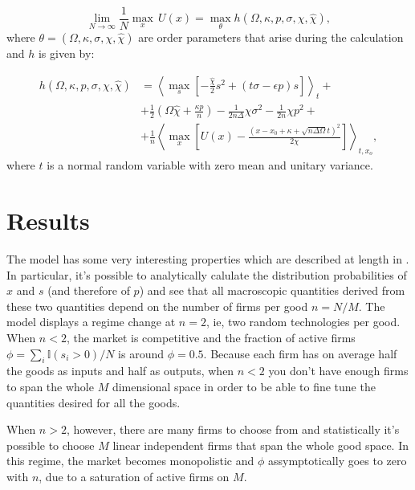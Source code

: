 \begin{equation}
  \label{eq:52}
  \lim_{N\to \infty} \frac{1}{N} \max_x \, U(x) = \max_\theta h(\Omega, \kappa,
  p, \sigma, \chi, \hat{\chi}),
\end{equation}
where $\theta = (\Omega, \kappa,
  \sigma, \chi, \hat{\chi})$ are order parameters that arise during
  the calculation and $h$ is given by:

\begin{align}
  \label{eq:53}
  h(\Omega, \kappa, p, \sigma, \chi, \hat{\chi})& = \left\langle
    \max_s \left[-\frac{\hat{\chi}}{2}s^2 + (t \sigma - \epsilon p)
                                                  s\right]
                                                  \right\rangle_t +
                                                  \nonumber\\ & +
  \frac{1}{2} \left(\Omega \hat{\chi} + \frac{\kappa p}{n}\right) -
  \frac{1}{2n\Delta} \chi \sigma^2 - \frac{1}{2n} \chi p^2 + \nonumber\\ &+
  \frac{1}{n} \left\langle \max_x \left[U(x) - \frac{(x - x_0 + \kappa +
      \sqrt{n\Delta\Omega}t)^2}{2\chi}\right] \right\rangle_{t,x_o},
\end{align}
where $t$ is a normal random variable with zero mean and unitary variance.


\section{Results}

The model has some very interesting properties which are described at
length in \cite{DeMartinoMarsili04}. In particular, it's possible to
analytically calulate the distribution probabilities of $x$ and $s$
(and therefore of $p$) and see that all macroscopic quantities derived
from these two quantities depend on the number of firms per good
$n = N/M$. The model displays a regime change at $n=2$, ie, two random
technologies per good. When $n<2$, the market is competitive and the
fraction of active firms $\phi = \sum_i \mathbb{I}(s_i > 0) / N$ is
around $\phi = 0.5$. Because each firm has on average half the goods
as inputs and half as outputs, when $n<2$ you don't have enough firms
to span the whole $M$ dimensional space in order to be able to fine
tune the quantities desired for all the goods.

When $n>2$, however, there are many firms to choose from and
statistically it's possible to choose $M$ linear independent firms
that span the whole good space. In this regime, the market becomes
monopolistic and $\phi$ assymptotically goes to zero with $n$, due to
a saturation of active firms on $M$. 

